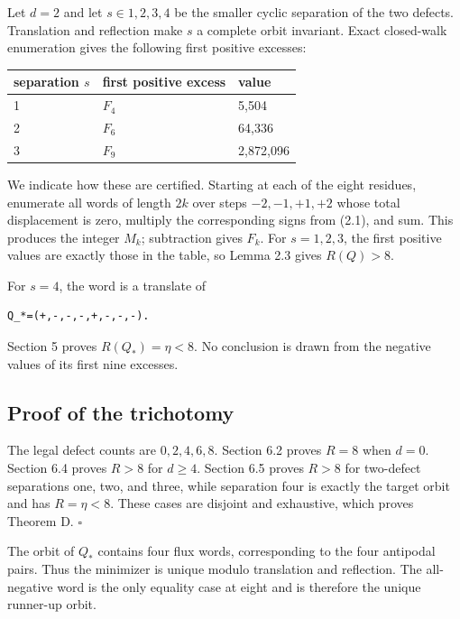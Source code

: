 Let \(d=2\) and let \(s \in {1,2,3,4}\) be the smaller cyclic separation of the
two defects. Translation and reflection make \(s\) a complete orbit invariant.
Exact closed-walk enumeration gives the following first positive excesses:

\begin{center}
\begin{tabular}{lll}
\toprule
separation \(s\) & first positive excess & value \\
\midrule
1 & \(F_4\) & 5,504 \\
2 & \(F_6\) & 64,336 \\
3 & \(F_9\) & 2,872,096 \\
\bottomrule
\end{tabular}%
\end{center}

We indicate how these are certified. Starting at each of the eight residues,
enumerate all words of length \(2k\) over steps \({-2,-1,+1,+2}\) whose total
displacement is zero, multiply the corresponding signs from (2.1), and sum.
This produces the integer \(M_k\); subtraction gives \(F_k\). For \(s=1,2,3\), the
first positive values are exactly those in the table, so Lemma 2.3 gives
\(R(Q)>8\).

For \(s=4\), the word is a translate of

\begin{lstlisting}[language={}]
Q_*=(+,-,-,-,+,-,-,-).
\end{lstlisting}

Section 5 proves \(R(Q_*)=\eta<8\). No conclusion is drawn from the negative
values of its first nine excesses.

\subsection{Proof of the trichotomy}

The legal defect counts are \(0,2,4,6,8\). Section 6.2 proves \(R=8\) when
\(d=0\). Section 6.4 proves \(R>8\) for \(d\ge 4\). Section 6.5 proves \(R>8\) for
two-defect separations one, two, and three, while separation four is exactly
the target orbit and has \(R=\eta<8\). These cases are disjoint and exhaustive,
which proves Theorem D. \(\square\)

The orbit of \(Q_*\) contains four flux words, corresponding to the four
antipodal pairs. Thus the minimizer is unique modulo translation and
reflection. The all-negative word is the only equality case at eight and is
therefore the unique runner-up orbit.

